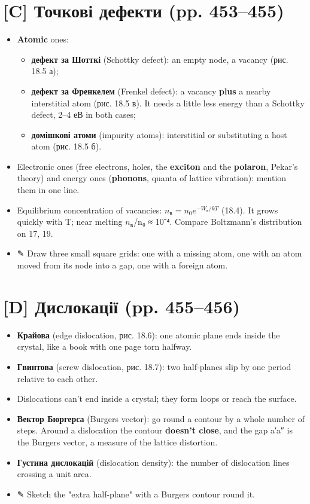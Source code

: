 \documentclass[11pt,a4paper,oneside]{book}
\newcommand{\pen}{{\sffamily\color{accent}✎}}
\begin{document}
\section*{[C] Точкові дефекти (pp. 453–455)}
\begin{itemize}
\item \textbf{Atomic} ones:
\begin{itemize}
\item \textbf{дефект за Шотткі} (Schottky defect): an empty node, a vacancy (рис. 18.5 а);
\item \textbf{дефект за Френкелем} (Frenkel defect): a vacancy \textbf{plus} a nearby interstitial atom (рис. 18.5 в). It needs a little less energy than a Schottky defect, 2–4 еВ in both cases;
\item \textbf{домішкові атоми} (impurity atoms): interstitial or substituting a host atom (рис. 18.5 б).
\end{itemize}
\item Electronic ones (free electrons, holes, the \textbf{exciton} and the \textbf{polaron}, Pekar's theory) and energy ones (\textbf{phonons}, quanta of lattice vibration): mention them in one line.
\item Equilibrium concentration of vacancies: $n_{\text{в}} = n_0e^{-W_{\text{в}}/kT}$ (18.4). It grows quickly with T; near melting $n_{\text{в}}$/n₀ ≈ 10⁻⁴. Compare Boltzmann's distribution on 17, 19.
\item \pen{} Draw three small square grids: one with a missing atom, one with an atom moved from its node into a gap, one with a foreign atom.
\end{itemize}

\section*{[D] Дислокації (pp. 455–456)}
\begin{itemize}
\item \textbf{Крайова} (edge dislocation, рис. 18.6): one atomic plane ends inside the crystal, like a book with one page torn halfway.
\item \textbf{Гвинтова} (screw dislocation, рис. 18.7): two half-planes slip by one period relative to each other.
\item Dislocations can't end inside a crystal; they form loops or reach the surface.
\item \textbf{Вектор Бюргерса} (Burgers vector): go round a contour by a whole number of steps. Around a dislocation the contour \textbf{doesn't close}, and the gap a′a″ is the Burgers vector, a measure of the lattice distortion.
\item \textbf{Густина дислокацій} (dislocation density): the number of dislocation lines crossing a unit area.
\item \pen{} Sketch the "extra half-plane" with a Burgers contour round it.
\end{itemize}
\end{document}
